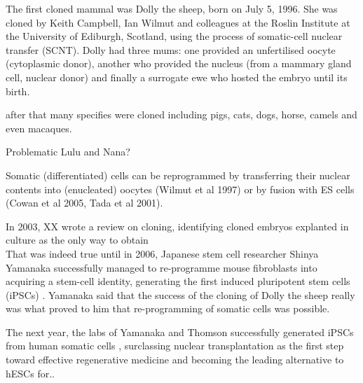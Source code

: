 The first cloned mammal was Dolly the sheep, born on July 5, 1996.
She was cloned by Keith Campbell, Ian Wilmut and colleagues at the Roslin Institute at the University of Ediburgh, Scotland, using the process of somatic-cell nuclear transfer (SCNT).
Dolly had three mums: one provided an unfertilised oocyte (cytoplasmic donor), another who provided the nucleus (from a mammary gland cell, nuclear donor) and finally a surrogate ewe who hosted the embryo until its birth.

after that many specifies were cloned including pigs, cats, dogs, horse, camels and even macaques.

Problematic Lulu and Nana?



Somatic (differentiated) cells can be reprogrammed by transferring their nuclear contents into (enucleated) oocytes (Wilmut et al 1997) or by fusion with ES cells (Cowan et al 2005, Tada et al 2001).

In 2003, XX wrote a review on cloning, identifying cloned embryos explanted in culture as the only way to obtain \\

That was indeed true until in 2006, Japanese stem cell researcher Shinya Yamanaka successfully managed to re-programme mouse fibroblasts into acquiring a stem-cell identity, generating the first induced pluripotent stem cells (iPSCs) \cite{takahashi2006induction}.
Yamanaka said that the success of the cloning of Dolly the sheep really was what proved to him that re-programming of somatic cells was possible.

The next year, the labs of Yamanaka and Thomson successfully generated iPSCs from human somatic cells \cite{takahashi2006induction, takahashi2007induction, yu2007induced}, surclassing nuclear transplantation as the first step toward effective regenerative medicine and becoming the leading alternative to hESCs for..

